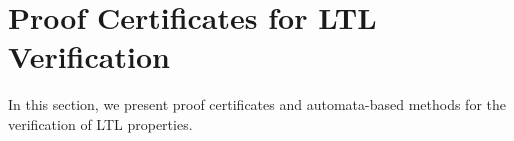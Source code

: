 \documentclass[acmlarge]{acmart}
\begin{document}

\section{Proof Certificates for LTL Verification}
\label{abm}
In this section, we present proof certificates and automata-based methods for the verification of LTL properties. 


 
\end{document}
